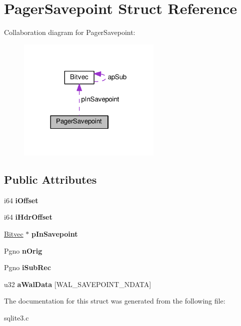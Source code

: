 \hypertarget{structPagerSavepoint}{}\section{Pager\+Savepoint Struct Reference}
\label{structPagerSavepoint}


Collaboration diagram for Pager\+Savepoint\+:\nopagebreak
\begin{figure}[H]
\begin{center}
\leavevmode
\includegraphics[width=194pt]{structPagerSavepoint__coll__graph}
\end{center}
\end{figure}
\subsection*{Public Attributes}
\begin{DoxyCompactItemize}
\item 
i64 {\bfseries i\+Offset}\hypertarget{structPagerSavepoint_ab3ee7b75a10f47a82c8e3312bee6ad60}{}\label{structPagerSavepoint_ab3ee7b75a10f47a82c8e3312bee6ad60}

\item 
i64 {\bfseries i\+Hdr\+Offset}\hypertarget{structPagerSavepoint_ae1afd1cf4fba6f7efd232656366121d1}{}\label{structPagerSavepoint_ae1afd1cf4fba6f7efd232656366121d1}

\item 
\hyperlink{structBitvec}{Bitvec} $\ast$ {\bfseries p\+In\+Savepoint}\hypertarget{structPagerSavepoint_abf7d6dc9d457c866727f84c4b9e0348f}{}\label{structPagerSavepoint_abf7d6dc9d457c866727f84c4b9e0348f}

\item 
Pgno {\bfseries n\+Orig}\hypertarget{structPagerSavepoint_a944cca2844a51bdba253476f516b9865}{}\label{structPagerSavepoint_a944cca2844a51bdba253476f516b9865}

\item 
Pgno {\bfseries i\+Sub\+Rec}\hypertarget{structPagerSavepoint_ac1accce313b9da31631892e2cbe85a2f}{}\label{structPagerSavepoint_ac1accce313b9da31631892e2cbe85a2f}

\item 
u32 {\bfseries a\+Wal\+Data} \mbox{[}W\+A\+L\+\_\+\+S\+A\+V\+E\+P\+O\+I\+N\+T\+\_\+\+N\+D\+A\+TA\mbox{]}\hypertarget{structPagerSavepoint_ac96cff844a24378c426a9901517f1d6c}{}\label{structPagerSavepoint_ac96cff844a24378c426a9901517f1d6c}

\end{DoxyCompactItemize}


The documentation for this struct was generated from the following file\+:\begin{DoxyCompactItemize}
\item 
sqlite3.\+c\end{DoxyCompactItemize}
